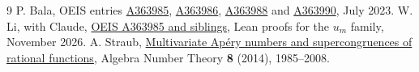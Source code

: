 \documentclass[11pt]{article}
\begin{document}
\begin{thebibliography}{9}
 P. Bala, OEIS entries \href{https://oeis.org/A363985}{A363985},
\href{https://oeis.org/A363986}{A363986}, \href{https://oeis.org/A363988}{A363988} and \href{https://oeis.org/A363990}{A363990}, July 2023.
 W. Li, with Claude, \href{https://github.com/VictorLiwentao/fc-palomar-proofs/tree/2329f9d4bebb30be1bb59e40476a89b44d6e034c/FCPalomar/OeisA363985}{OEIS A363985 and siblings}, Lean proofs for the $u_m$ family, November 2026.
 A. Straub, \href{https://doi.org/10.2140/ant.2014.8.1985}{Multivariate Ap\'ery numbers and supercongruences of rational functions}, Algebra Number Theory \textbf{8} (2014), 1985--2008.
\end{thebibliography}
\end{document}
